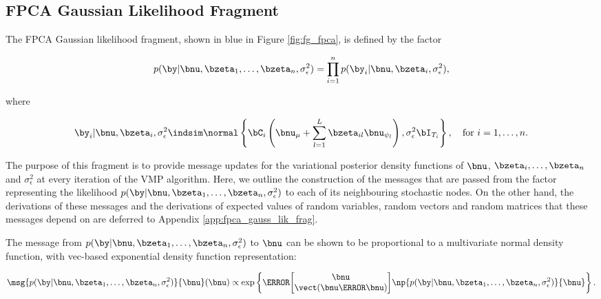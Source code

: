 \documentclass[12pt]{article}
\def\sigsqeps{\sigma^2_{\epsilon}}
\def\numu{\bnu_\mu}
\newcommand\nupsi[1]{\bnu_{\psi_{#1}}}
\theoremstyle{plain}
\theoremstyle{definition}
\theoremstyle{remark}
\begin{document}

\subsection{FPCA Gaussian Likelihood Fragment}
\label{sec:fpca_gauss_lik_frag}

The FPCA Gaussian likelihood fragment, shown in blue in Figure \ref{fig:fg_fpca}, is defined by the factor

\begin{equation}
	p (\by | \bnu, \bzeta_1, \dots, \bzeta_n, \sigsqeps) =
		\prod_{i=1}^n p (\by_i | \bnu, \bzeta_i, \sigsqeps),
\label{fpc_gauss_lik_factorized}
\end{equation}

\noindent where

\begin{equation}
	\by_i | \bnu, \bzeta_i, \sigsqeps \indsim \normal \left\{
		\bC_i \left( \numu + \sum_{l=1}^L \bzeta_{il} \nupsi{l} \right), \sigsqeps \bI_{T_i}
	\right\}, \quad \text{for $i = 1, \dots, n$}.
\label{fpc_gauss_lik_factor}
\end{equation}

\noindent The purpose of this fragment is to provide message updates for the variational posterior density functions
of $\bnu$, $\bzeta_i, \dots, \bzeta_n$ and $\sigsqeps$ at every iteration of the VMP algorithm.
Here, we outline the construction of the messages that are passed from the factor representing
the likelihood $p (\by | \bnu, \bzeta_1, \dots, \bzeta_n, \sigsqeps)$ to each of its neighbouring stochastic nodes.
On the other hand, the
derivations of these messages and the derivations of expected values of random variables, random vectors
and random matrices that these messages depend on are deferred to Appendix \ref{app:fpca_gauss_lik_frag}.

The message from $p (\by | \bnu, \bzeta_1, \dots, \bzeta_n, \sigsqeps)$ to $\bnu$ can be shown to be
proportional to a multivariate
normal density function, with vec-based exponential density function representation:

\begin{equation}
	\msg{p (\by | \bnu, \bzeta_1, \dots, \bzeta_n, \sigsqeps)}{\bnu} (\bnu) \propto
		\exp \left\{
			\T{\begin{bmatrix}
				\bnu \\
				\vect (\bnu \T{\bnu})
			\end{bmatrix}}
			\np{p (\by | \bnu, \bzeta_1, \dots, \bzeta_n, \sigsqeps)}{\bnu}
		\right\}.
\label{msg_lik_nu}
\end{equation}
\end{document}
